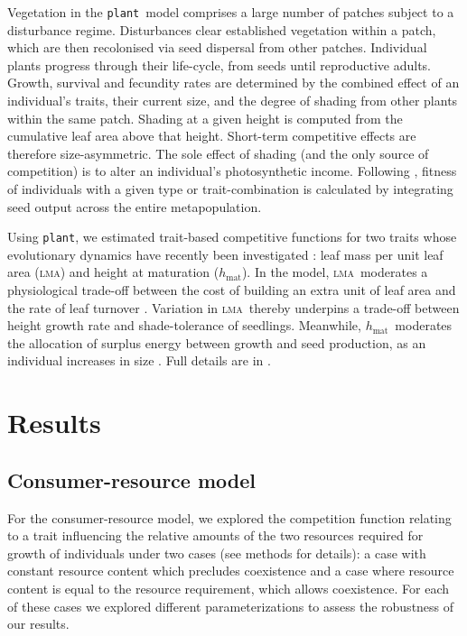 \documentclass[a4paper,11pt]{article}
\newcommand{\plant}{{\tt plant}}
\newcommand{\hmat}{\ensuremath{h_{\text{mat}}}}
\newcommand{\lma}{\textsc{lma}}
\begin{document}
Vegetation in the \plant\ model comprises a large number of patches subject to a disturbance regime. Disturbances clear established vegetation within a patch, which are then recolonised via seed dispersal from other patches. Individual plants progress through their life-cycle, from seeds until reproductive adults. Growth, survival and fecundity rates are determined by the combined effect of an individual's traits, their current size, and the degree of shading from other plants within the same patch. Shading at a given height is computed from the cumulative leaf area above that height. Short-term competitive effects are therefore size-asymmetric. The sole effect of shading (and the only source of competition) is to alter an individual's photosynthetic income. Following \citet{Falster-2017}, fitness of individuals with a given type or trait-combination is calculated by integrating seed output across the entire metapopulation. 

Using \plant, we estimated trait-based competitive functions for two traits whose evolutionary dynamics have recently been investigated \citep{Falster-2017}: leaf mass per unit leaf area (\lma) and height at maturation (\hmat). In the model, \lma\ moderates a physiological trade-off between the cost of building an extra unit of leaf area and the rate of leaf turnover \citep{Wright-2004}. Variation in \lma\ thereby underpins a trade-off between height growth rate and shade-tolerance of seedlings. Meanwhile, \hmat\ moderates the allocation of surplus energy between growth and seed production, as an individual increases in size \citep{Falster-2017}. Full details are in \citet{Falster-2016, Falster-2017}.

\section{Results}

\subsection{Consumer-resource model}

For the consumer-resource model, we explored the competition function relating to a trait influencing the relative amounts of the two resources required for growth of individuals under two cases (see methods for details): a case with constant resource content which precludes coexistence and a case where resource content is equal to the resource requirement, which allows coexistence. For each of these cases we explored different parameterizations to assess the robustness of our results.
\end{document}
